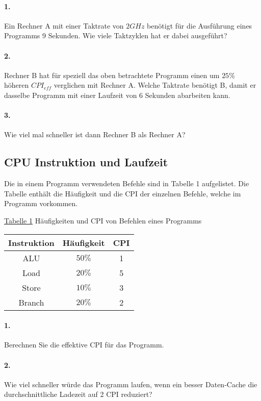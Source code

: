 \documentclass[paper=a4, fontsize=11pt]{scrartcl}
\numberwithin{equation}{section}
\numberwithin{figure}{section}
\numberwithin{table}{section}
\begin{document}
\paragraph{1.}
Ein Rechner A mit einer Taktrate von $2GHz$ benötigt für die Ausführung eines Programms 9 Sekunden. Wie viele Taktzyklen hat er dabei ausgeführt?

\paragraph{2.}
Rechner B hat für speziell das oben betrachtete Programm einen um $25 \%$ höheren $CPI_{eff}$ verglichen mit Rechner A. Welche Taktrate benötigt B, damit er dasselbe Programm mit einer Laufzeit von 6 Sekunden abarbeiten kann.

\paragraph{3.}
Wie viel mal schneller ist dann Rechner B als Rechner A?

\subsection{CPU Instruktion und Laufzeit}
Die in einem Programm verwendeten Befehle sind in Tabelle 1 aufgelistet. Die Tabelle enthält die Häufigkeit und die CPI der einzelnen Befehle, welche im Programm vorkommen.

\underline{Tabelle 1}
Häufigkeiten und CPI von Befehlen eines Programms
\begin{tabular}{c|c|c}
Instruktion & Häufigkeit & CPI \\
\hline
ALU & $50 \%$ & 1 \\
\hline
Load & $20 \%$ & 5 \\
\hline
Store & $10 \%$ & 3 \\
\hline
Branch & $20 \%$ & 2 \\
\end{tabular}

\paragraph{1.}
Berechnen Sie die effektive CPI für das Programm.

\paragraph{2.}
Wie viel schneller würde das Programm laufen, wenn ein besser Daten-Cache die durchschnittliche Ladezeit auf 2 CPI reduziert?
\end{document}
